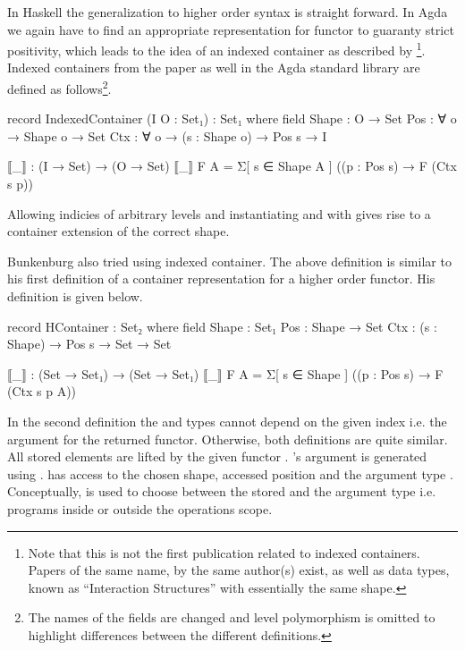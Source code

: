 In Haskell the generalization to higher order syntax is straight forward.
In Agda we again have to find an appropriate representation for functor to
guaranty strict positivity, which leads to the idea of an indexed container as
described by \textcite{DBLP:journals/jfp/AltenkirchGHMM15}
\footnote{Note that this is not the first publication related to indexed
  containers. Papers of the same name, by the same author(s) exist, as well as
  data types, known as ``Interaction Structures'' with essentially the same
  shape.}. 
Indexed containers from the paper as well in the Agda standard library are
defined as follows\footnote{The names of the fields are changed and level
  polymorphism is omitted to highlight differences between the different
  definitions.}.

\begin{code}
record IndexedContainer (I O : Set₁) : Set₁ where
  field
    Shape : O → Set
    Pos : ∀ {o} → Shape o → Set
    Ctx : ∀ {o} → (s : Shape o) → Pos s → I

  ⟦_⟧ : (I → Set) → (O → Set)
  ⟦_⟧ F A = Σ[ s ∈ Shape A ] ((p : Pos s) → F (Ctx s p))
\end{code}
Allowing indicies of arbitrary levels and instantiating  and
 with  gives rise to a container extension
of the correct shape.

Bunkenburg also tried using indexed container.
The above definition is similar to his first definition of a container
representation for a higher order functor.
His definition is given below.
\begin{code}
record HContainer : Set₂ where
  field
    Shape : Set₁
    Pos : Shape → Set
    Ctx : (s : Shape) → Pos s → Set → Set

  ⟦_⟧ : (Set → Set₁) → (Set → Set₁)
  ⟦_⟧ F A = Σ[ s ∈ Shape ] ((p : Pos s) → F (Ctx s p A))
\end{code}
In the second definition the  and  types cannot
depend on the given index i.e. the argument for the returned functor.
Otherwise, both definitions are quite similar.
All stored elements are lifted by the given functor .
's argument is generated using .
 has access to the chosen shape, accessed position and the 
argument type .
Conceptually,  is used to choose between the stored
 and the argument type  i.e. programs inside or
outside the operations scope.


